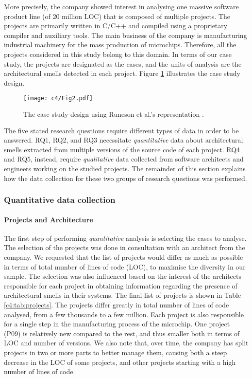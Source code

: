 More precisely, the company showed interest in analysing one massive software product line (of 20 million LOC) that is composed of multiple projects.
The projects are primarily written in C/C++ and compiled using a proprietary compiler and auxiliary tools.
The main business of the company is manufacturing industrial machinery for the mass production of microchips. Therefore, all the projects considered in this study belong to this domain. In terms of our case study, the projects are designated as the cases, and the units of analysis are the architectural smells detected in each project. Figure \ref{c4:fig:case-design} illustrates the case study design.

\begin{figure}[h]
    \centering
    \texttt{[image: c4/Fig2.pdf]}
    \caption{The case study design using Runeson et al.'s representation \cite{Runeson2012}.}
    \label{c4:fig:case-design}
\end{figure}

The five stated research questions require different types of data in order to be answered.
RQ1, RQ2, and RQ3 necessitate \emph{quantitative} data about architectural smells extracted from multiple versions of the source code of each project.
RQ4 and RQ5, instead, require \emph{qualitative} data collected from software architects and engineers working on the studied projects.
The remainder of this section explains how the data collection for these two groups of research questions was performed.

\subsubsection{Quantitative data collection}
\paragraph{Projects and Architecture}
The first step of performing \emph{quantitative} analysis is selecting the cases to analyse. 
The selection of the projects was done in consultation with an architect from the company. We requested that the list of projects would differ as much as possible in terms of total number of lines of code (LOC), to maximise the diversity in our sample.
The selection was also influenced based on the interest of the architects responsible for each project in obtaining information regarding the presence of architectural smells in their systems.
The final list of projects is shown in Table \ref{c4:tab:projects}.
The projects differ greatly in total number of lines of code analysed, from a few thousands to a few million. Each project is also responsible for a single step in the manufacturing process of the microchip.
One project (P09) is relatively new compared to the rest, and thus smaller both in terms of LOC and number of versions.
We also note that, over time, the company has split projects in two or more parts to better manage them, causing both a steep decrease in the LOC of some projects, and other projects starting with a high number of lines of code.


